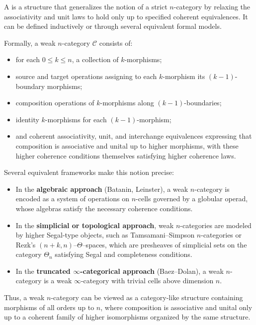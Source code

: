 \begin{definition}
    A  is a structure that generalizes the notion of a strict $n$-category by relaxing the associativity and unit laws to hold only up to specified coherent equivalences.  
    It can be defined inductively or through several equivalent formal models.

    Formally, a weak $n$-category $\mathcal{C}$ consists of:
    \begin{itemize}
    \item for each $0 \le k \le n$, a collection of $k$-morphisms;
    \item source and target operations assigning to each $k$-morphism its $(k-1)$-boundary morphisms;
    \item composition operations of $k$-morphisms along $(k-1)$-boundaries;
    \item identity $k$-morphisms for each $(k-1)$-morphism;
    \item and {coherent associativity, unit, and interchange equivalences}
    expressing that composition is associative and unital up to higher morphisms, 
    with these higher coherence conditions themselves satisfying higher coherence laws.
    \end{itemize}

    Several equivalent frameworks make this notion precise:

    \begin{itemize}
    \item In the \textbf{algebraic approach} (Batanin, Leinster), a weak $n$-category is encoded as a system of operations on $n$-cells governed by a globular operad, whose algebras satisfy the necessary coherence conditions.
    \item In the \textbf{simplicial or topological approach}, weak $n$-categories are modeled by higher Segal-type objects, such as Tamsamani–Simpson $n$-categories or Rezk’s $(n+k,n)$–$\Theta$–spaces, which are presheaves of simplicial sets on the category $\Theta_n$ satisfying Segal and completeness conditions.
    \item In the \textbf{truncated $\infty$-categorical approach} (Baez–Dolan), a weak $n$-category is a weak $\infty$-category with trivial cells above dimension $n$.
    \end{itemize}

    Thus, a weak $n$-category can be viewed as a category-like structure containing morphisms of all orders up to $n$, where composition is associative and unital only up to a coherent family of higher isomorphisms organized by the same structure.
\end{definition}



